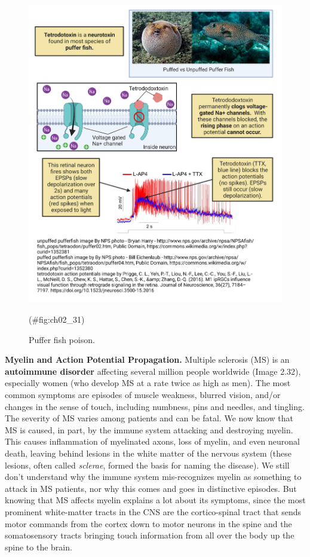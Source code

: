 \documentclass[
]{book}
\begin{document}
\begin{figure}

{\centering \includegraphics[width=0.8\linewidth]{images/ch02/02_30} 

}

\caption{Puffer fish poison.}(\#fig:ch02_31)
\end{figure}

\textbf{Myelin and Action Potential Propagation. }Multiple sclerosis (MS) is an \textbf{autoimmune disorder} affecting several million people worldwide (Image 2.32), especially women (who develop MS at a rate twice as high as men). The most common symptoms are episodes of muscle weakness, blurred vision, and/or changes in the sense of touch, including numbness, pins and needles, and tingling. The severity of MS varies among patients and can be fatal. We now know that MS is caused, in part, by the immune system attacking and destroying myelin. This causes inflammation of myelinated axons, loss of myelin, and even neuronal death, leaving behind lesions in the white matter of the nervous system (these lesions, often called \emph{sclerae}, formed the basis for naming the disease). We still don't understand why the immune system mis-recognizes myelin as something to attack in MS patients, nor why this comes and goes in distinctive episodes. But knowing that MS affects myelin explains a lot about its symptoms, since the most prominent white-matter tracts in the CNS are the cortico-spinal tract that sends motor commands from the cortex down to motor neurons in the spine and the somatosensory tracts bringing touch information from all over the body up the spine to the brain.
\end{document}
